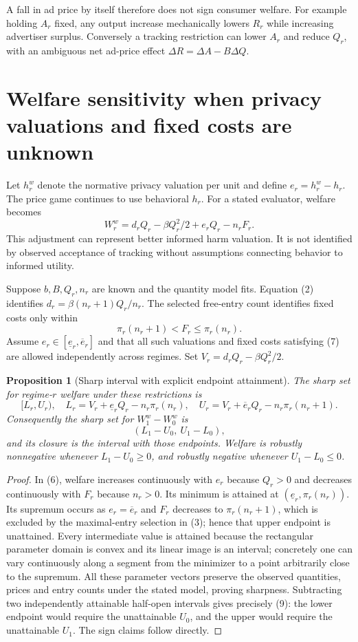 \documentclass[11pt]{article}
\newtheorem{proposition}[theorem]{Proposition}
\theoremstyle{remark}
\begin{document}
A fall in ad price by itself therefore does not sign consumer welfare. For example holding $A_r$ fixed, any output increase mechanically lowers $R_r$ while increasing advertiser surplus. Conversely a tracking restriction can lower $A_r$ and reduce $Q_r$, with an ambiguous net ad-price effect $\Delta R=\Delta A-B\Delta Q$.

\section{Welfare sensitivity when privacy valuations and fixed costs are unknown}
Let $h_r^w$ denote the normative privacy valuation per unit and define $e_r=h_r^w-h_r$. The price game continues to use behavioral $h_r$. For a stated evaluator, welfare becomes
\[
 W_r^w=d_rQ_r-\beta Q_r^2/2+e_rQ_r-n_rF_r.              \tag{6}
\]
This adjustment can represent better informed harm valuation. It is not identified by observed acceptance of tracking without assumptions connecting behavior to informed utility.

Suppose $b,B,Q_r,n_r$ are known and the quantity model fits. Equation (2) identifies
$d_r=\beta(n_r+1)Q_r/n_r$. The selected free-entry count identifies fixed costs only within
\[
 \pi_r(n_r+1)<F_r\leq\pi_r(n_r).                        \tag{7}
\]
Assume $e_r\in[\underline e_r,\overline e_r]$ and that all such valuations and fixed costs satisfying (7) are allowed independently across regimes. Set
$V_r=d_rQ_r-\beta Q_r^2/2$.

\begin{proposition}[Sharp interval with explicit endpoint attainment]
The sharp set for regime-$r$ welfare under these restrictions is
\[
 [L_r,U_r),\quad
 L_r=V_r+\underline e_rQ_r-n_r\pi_r(n_r),\quad
 U_r=V_r+\overline e_rQ_r-n_r\pi_r(n_r+1).                \tag{8}
\]
Consequently the sharp set for $W_1^w-W_0^w$ is
\[
 (L_1-U_0,\ U_1-L_0),                                  \tag{9}
\]
and its closure is the interval with those endpoints. Welfare is robustly nonnegative whenever $L_1-U_0\geq0$, and robustly negative whenever $U_1-L_0\leq0$.
\end{proposition}
\begin{proof}
In (6), welfare increases continuously with $e_r$ because $Q_r>0$ and decreases continuously with $F_r$ because $n_r>0$. Its minimum is attained at $(\underline e_r,\pi_r(n_r))$. Its supremum occurs as $e_r=\overline e_r$ and $F_r$ decreases to $\pi_r(n_r+1)$, which is excluded by the maximal-entry selection in (3); hence that upper endpoint is unattained. Every intermediate value is attained because the rectangular parameter domain is convex and its linear image is an interval; concretely one can vary continuously along a segment from the minimizer to a point arbitrarily close to the supremum. All these parameter vectors preserve the observed quantities, prices and entry counts under the stated model, proving sharpness. Subtracting two independently attainable half-open intervals gives precisely (9): the lower endpoint would require the unattainable $U_0$, and the upper would require the unattainable $U_1$. The sign claims follow directly.
\end{proof}
\end{document}
